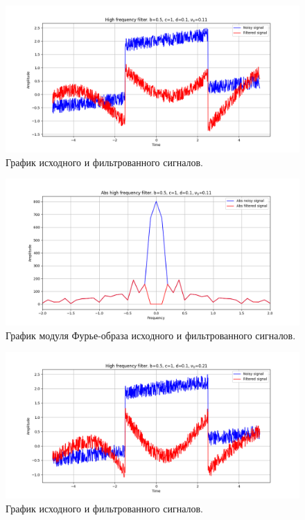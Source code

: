 \documentclass[a4paper, 12pt]{article}
\begin{document}
    \begin{figure}[!htb]
        \centering
        \includegraphics[scale=0.485]{1_u_flt_u_nolow.png}
        \captionsetup{skip=0pt}
        \caption{График исходного и фильтрованного сигналов.}
        \label{fig:fig27}
    \end{figure}
    \begin{figure}[!htb]
        \centering
        \includegraphics[scale=0.485]{1_abs_u_U_nolow.png}
        \captionsetup{skip=0pt}
        \caption{График модуля Фурье-образа исходного и фильтрованного сигналов.}
        \label{fig:fig28}
    \end{figure}
    \begin{figure}[!htb]
        \centering
        \includegraphics[scale=0.485]{2_u_flt_u_nolow.png}
        \captionsetup{skip=0pt}
        \caption{График исходного и фильтрованного сигналов.}
        \label{fig:fig29}
    \end{figure}
\end{document}

